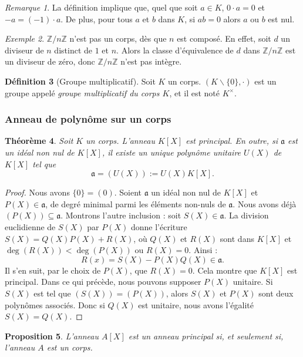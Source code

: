 \documentclass[a4paper, titlepage]{article}
\newtheorem{theo}{Théorème}[section]
\newtheorem{prop}[theo]{Proposition}
\theoremstyle{definition}
\newtheorem{defi}[theo]{Définition}
\theoremstyle{remark}
\newtheorem{rema}[theo]{Remarque}
\newtheorem{exem}[theo]{Exemple}
\def\Z{\mathbb Z}
\begin{document}
\begin{rema}
La définition implique que, quel que soit $a \in K$, $0\cdot a = 0$ et $-a = (-1)\cdot a$. De plus, pour tous $a$ et $b$ dans $K$, si $ab = 0$ alors $a$ ou $b$ est nul.
\end{rema}

\begin{exem}
$\Z/n\Z$ n'est pas un corps, dès que $n$ est composé. En effet, soit $d$ un diviseur de $n$ distinct de $1$ et $n$. Alors la classe d'équivalence de $d$ dans $\Z/n\Z$ est un diviseur de zéro, donc $\Z/n\Z$ n'est pas intègre.
\end{exem}

\begin{defi}[Groupe multiplicatif]
Soit $K$ un corps. $(K\backslash\{0\},\cdot)$ est un groupe appelé \textit{groupe multiplicatif du corps $K$}, et il est noté $K^\times$.
\end{defi}

\subsubsection*{Anneau de polynôme sur un corps}

\begin{theo}\label{theoAnnPolyPrincipal}
Soit $K$ un corps. L'anneau $K[X]$ est principal. En outre, si $\mathfrak{a}$ est un idéal non nul de $K[X]$, il existe un unique polynôme unitaire $U(X)$ de $K[X]$ tel que $$\mathfrak{a} = (U(X)) := U(X)K[X].$$
\end{theo}

\begin{proof}
Nous avons $\{0\} = (0)$. Soient $\mathfrak{a}$ un idéal non nul de $K[X]$ et $P(X) \in \mathfrak{a}$, de degré minimal parmi les éléments non-nuls de $\mathfrak{a}$. Nous avons déjà $(P(X)) \subseteq \mathfrak{a}$. Montrons l'autre inclusion : soit $S(X) \in \mathfrak{a}$. La division euclidienne de $S(X)$ par $P(X)$ donne l'écriture $S(X) = Q(X)P(X) + R(X)$, où $Q(X)$ et $R(X)$ sont dans $K[X]$ et $\deg(R(X))< \deg(P(X))$ ou $R(X) = 0$. Ainsi : $$R(x) = S(X) - P(X)Q(X) \in \mathfrak{a}.$$
Il s'en suit, par le choix de $P(X)$, que $R(X) = 0$. Cela montre que $K[X]$ est principal. Dans ce qui précède, nous pouvons supposer $P(X)$ unitaire. Si $S(X)$ est tel que $(S(X)) = (P(X))$, alors $S(X)$ et $P(X)$ sont deux polynômes associés. Donc si $Q(X)$ est unitaire, nous avons l'égalité $S(X) = Q(X)$.
\end{proof}

\begin{prop}
L'anneau $A[X]$ est un anneau principal si, et seulement si, l'anneau $A$ est un corps.
\end{prop}
\end{document}
